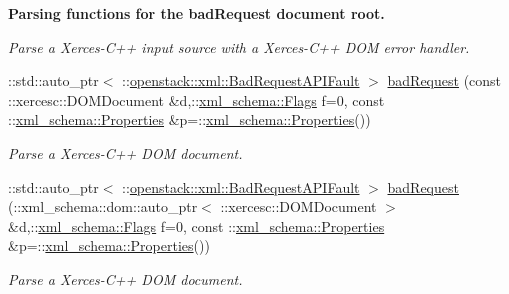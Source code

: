 \begin{Indent}{\bf Parsing functions for the badRequest document root.}
\begin{DoxyCompactItemize}
\begin{DoxyCompactList}\small\item\em Parse a Xerces-\/C++ input source with a Xerces-\/C++ DOM error handler. \item\end{DoxyCompactList}\item 
::std::auto\_\-ptr$<$ ::\hyperlink{classopenstack_1_1xml_1_1BadRequestAPIFault}{openstack::xml::BadRequestAPIFault} $>$ \hyperlink{namespaceopenstack_1_1xml_a9a97bc57b573e41c9222343b5f3d68fd}{badRequest} (const ::xercesc::DOMDocument \&d,::\hyperlink{namespacexml__schema_affb4c227cbd9aa7453dd1dc5a1401943}{xml\_\-schema::Flags} f=0, const ::\hyperlink{namespacexml__schema_ad27ce19a7ee1d3b1064092648898f64c}{xml\_\-schema::Properties} \&p=::\hyperlink{namespacexml__schema_ad27ce19a7ee1d3b1064092648898f64c}{xml\_\-schema::Properties}())
\begin{DoxyCompactList}\small\item\em Parse a Xerces-\/C++ DOM document. \item\end{DoxyCompactList}\item 
::std::auto\_\-ptr$<$ ::\hyperlink{classopenstack_1_1xml_1_1BadRequestAPIFault}{openstack::xml::BadRequestAPIFault} $>$ \hyperlink{namespaceopenstack_1_1xml_a29f4f55220f1bd76be487ac174ea9c84}{badRequest} (::xml\_\-schema::dom::auto\_\-ptr$<$ ::xercesc::DOMDocument $>$ \&d,::\hyperlink{namespacexml__schema_affb4c227cbd9aa7453dd1dc5a1401943}{xml\_\-schema::Flags} f=0, const ::\hyperlink{namespacexml__schema_ad27ce19a7ee1d3b1064092648898f64c}{xml\_\-schema::Properties} \&p=::\hyperlink{namespacexml__schema_ad27ce19a7ee1d3b1064092648898f64c}{xml\_\-schema::Properties}())
\begin{DoxyCompactList}\small\item\em Parse a Xerces-\/C++ DOM document. \item\end{DoxyCompactList}\end{DoxyCompactItemize}
\end{Indent}
